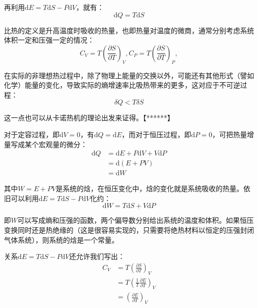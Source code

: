 \documentclass[UTF8]{ctexart}
\begin{document}
\begin{spacing}{2.0}
再利用$\text{d}E=T\text{d}S-P\text{d}V$，就有：
\begin{equation}
\text{d}Q=T\text{d}S
\end{equation}

比热的定义是升高温度时吸收的热量，也即热量对温度的微商，通常分别考虑系统体积一定和压强一定的情况：
\begin{equation}
C_{V}=T\left(\frac{\partial S}{\partial T} \right)_{V},C_{P}=T\left(\frac{\partial S}{\partial T} \right)_{P},
\end{equation}

在实际的非理想热过程中，除了物理上能量的交换以外，可能还有其他形式（譬如化学）能量的变化，导致实际的熵增速率比吸热带来的更多，这对应于不可逆过程：
\begin{equation}
\delta Q < T\delta S
\end{equation}

这一点也可以从卡诺热机的理论出发来证得。【******】

对于定容过程，即$\text{d}V=0$，有$\text{d}Q=\text{d}E$，而对于恒压过程，即$\text{d}P=0$，可把热量增量写成某个宏观量的微分：
\begin{equation}
\begin{aligned}
\text{d}Q&= \text{d}E+P\text{d}V+V\text{d}P \\
&=\text{d}(E+PV)\\
&=\text{d}W
\end{aligned}
\end{equation}

其中$W=E+PV$是系统的焓，在恒压变化中，焓的变化就是系统吸收的热量。依旧可以利用$\text{d}E=T\text{d}S-P\text{d}V$化约：
\begin{equation}
\text{d}W=T\text{d}S+V\text{d}P
\end{equation}

即$W$可以写成熵和压强的函数，两个偏导数分别给出系统的温度和体积。如果恒压变换同时还是热绝缘的（这是很容易实现的，只需要将绝热材料以恒定的压强封闭气体系统），则系统的焓是一个常量。

关系$\text{d}E=T\text{d}S-P\text{d}V$还允许我们写出：
\begin{equation}
\begin{aligned}
C_{V}&= T\left(\frac{\partial S}{\partial T}\right)_{V} \\
&= T\left(\frac{1}{T} \frac{\partial E}{\partial T} \right)_{V} \\
&= \left(\frac{\partial E}{\partial T} \right)_{V}
\end{aligned}
\end{equation}


\end{spacing}
\end{document}

